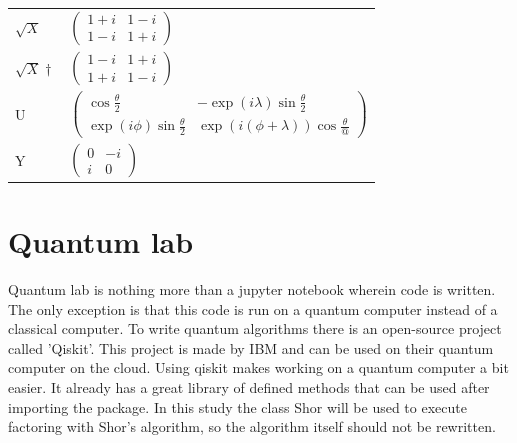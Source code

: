 \begin{table}[]
\begin{tabular}{l|l}
        $\sqrt{X}$                        & $\begin{pmatrix} 1+i&1-i                                                  \\ 1-i&1+i                                                                                                                                                                            \end{pmatrix}$ \\
        $\sqrt{X}\dagger$                 & $\begin{pmatrix} 1-i&1+i                                                  \\ 1+i&1-i                                                                                                                                                                            \end{pmatrix}$ \\
        U                                 & $\begin{pmatrix} \cos\frac{\theta}{2}&-\exp(i\lambda)\sin\frac{\theta}{2} \\ \exp(i\phi)\sin\frac{\theta}{2}&\exp(i(\phi+\lambda))\cos\frac{\theta}{@}                                                                                                          \end{pmatrix}$ \\
        Y                                 & $\begin{pmatrix} 0&-i \\ i&0                                                                                                                                                                                                                                    \end{pmatrix}$                                   
        \end{tabular}
\end{table}

\section{Quantum lab}
\label{sec:Qlab}
Quantum lab is nothing more than a jupyter notebook wherein code is written. The only exception is that this code is run on a quantum computer instead of a classical computer.
To write quantum algorithms there is an open-source project called 'Qiskit'. This project is made by IBM and can be used on their quantum computer on the cloud. Using qiskit makes working on a quantum computer a bit easier.
It already has a great library of defined methods that can be used after importing the package. In this study the class Shor will be used to execute factoring with Shor's algorithm, so the algorithm itself should not be rewritten.
